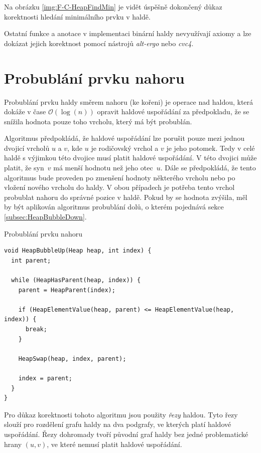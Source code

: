 Na obrázku \ref{img:F-C-HeapFindMin} je vidět úspěšně dokončený důkaz korektnosti hledání minimálního prvku v haldě.

Ostatní funkce a anotace v implementaci binární haldy nevyužívají axiomy a lze dokázat jejich korektnost pomocí nástrojů \textit{alt-ergo} nebo \textit{cvc4}.

\section{Probublání prvku nahoru}
\label{subsec:HeapBubbleUp}

Probublání prvku haldy směrem nahoru (ke kořeni) je operace nad haldou, která dokáže v čase $\mathcal{O}(\log(n))$ opravit haldové uspořádání za předpokladu, že se snížila hodnota pouze toho vrcholu, který má být probublán.

Algoritmus předpokládá, že haldové uspořádání lze porušit pouze mezi jednou dvojicí vrcholů $u$ a $v$, kde $u$ je rodičovský vrchol a $v$ je jeho potomek. Tedy v celé haldě s výjimkou této dvojice musí platit haldové uspořádání. V této dvojici může platit, že syn~$v$ má menší hodnotu než jeho otec~$u$. Dále se předpokládá, že tento algoritmus bude proveden po zmenšení hodnoty některého vrcholu nebo po vložení nového vrcholu do haldy. V obou případech je potřeba tento vrchol probublat nahoru do správné pozice v haldě. Pokud by se hodnota zvýšila, měl by být aplikován algoritmus probublání dolů, o kterém pojednává sekce \ref{subsec:HeapBubbleDown}.

\begin{listing}[H]
	\caption{Probublání prvku nahoru}
	\label{list:HeapBubbleUp}
	\begin{verbatim}
void HeapBubbleUp(Heap heap, int index) {
  int parent;

  while (HeapHasParent(heap, index)) {
    parent = HeapParent(index);

    if (HeapElementValue(heap, parent) <= HeapElementValue(heap, index)) {
      break;
    }

    HeapSwap(heap, index, parent);

    index = parent;
  }
}
	\end{verbatim}
\end{listing}

Pro důkaz korektnosti tohoto algoritmu jsou použity \textit{řezy} haldou. Tyto řezy slouží pro rozdělení grafu haldy na dva podgrafy, ve kterých platí haldové uspořádání. Řezy dohromady tvoří původní graf haldy bez jedné problematické hrany $(u, v)$, ve které nemusí platit haldové uspořádání.

